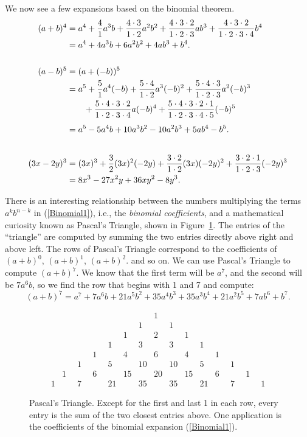 \bex We now see a few expansions based on
the binomial theorem.
\begin{align*}
(a+b)^4&=a^4+\frac41a^3b+\frac{4\cdot 3}{1\cdot 2}a^2b^2
         +\frac{4\cdot3\cdot2}{1\cdot2\cdot3}ab^3
         +\frac{4\cdot3\cdot2}{1\cdot2\cdot3\cdot4}b^4\\
 &=a^4+4a^3b+6a^2b^2+4ab^3+b^4.\\ \\
(a-b)^5&=(a+(-b))^5\\
&=a^5+\frac{5}{1}a^4(-b)+\frac{5\cdot4}{1\cdot2}a^3(-b)^2
      +\frac{5\cdot4\cdot3}{1\cdot2\cdot3}a^2(-b)^3\\
&\qquad+\frac{5\cdot4\cdot3\cdot2}{1\cdot2\cdot3\cdot4}a(-b)^4
       +\frac{5\cdot4\cdot3\cdot2\cdot1}{1\cdot2\cdot3\cdot4\cdot5}
         (-b)^5\\ \vphantom{\frac12}
&=a^5-5a^4b+10a^3b^2-10a^2b^3+5ab^4-b^5.\\ \\
(3x-2y)^3&=(3x)^3+\frac32(3x)^2(-2y)+\frac{3\cdot2}{1\cdot2}(3x)(-2y)^2
         +\frac{3\cdot2\cdot1}{1\cdot2\cdot3}(-2y)^3\\
&=8x^3-27x^2y+36xy^2-8y^3.
\end{align*}

\eex

There is an interesting relationship between the numbers
multiplying the terms $a^kb^{n-k}$ in (\ref{Binomial1}),
i.e., the {\it binomial coefficients}, and 
a mathematical curiosity known as Pascal's Triangle,
shown in Figure~\ref{Pascal'sTriangle}.
The entries of the ``triangle'' are computed by
summing the two entries directly above right and above left.
The rows of Pascal's Triangle correspond to the 
coefficients of $(a+b)^0$, $(a+b)^1$, $(a+b)^2$.
and so on.  
\bex We can use Pascal's Triangle to compute $(a+b)^7$.
We know that the first term will be $a^7$, and the 
second will be $7a^6b$, so we find the row that begins
with 1 and 7 and compute:
$$(a+b)^7
=a^7+7a^6b+21a^5b^2+35a^4b^3+35a^3b^4+21a^2b^5+7ab^6+b^7.$$

\eex


\begin{figure}
$$\begin{array}{ccccccccccccccc}
&&\quad&\quad&\quad&\quad&\quad&1&    \quad&\quad&\quad&\quad&\quad\\
&\quad&&\quad&\quad&\quad&1&\quad&1&\quad&\quad&\quad&\quad\\
&&&\quad&\quad&1&\quad&2&    \quad&1&\quad&\quad&\quad\\
&&&\quad&1&\quad&3&\quad&3&\quad&1&\quad&\quad\\
&&&1&\quad&4&\quad&6&\quad&4&\quad&1&\quad\\
&&1&\quad&5&\quad&10&\quad&10&\quad&5&\quad&1\\
&1&\quad&6&\quad&15&&20&&15&&6&\quad&1\\
1&&7&&21&&35&&35&&21&&7&\quad&1
\end{array}$$
\caption{Pascal's Triangle.  Except for the first and
last 1 in each row, every entry is the sum of the two
closest entries  above.  One application is the
coefficients of the binomial expansion (\ref{Binomial1}).}
\label{Pascal'sTriangle}\end{figure}

